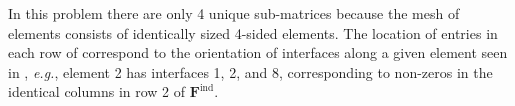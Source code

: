 \noindent
In this problem there are only 4 unique sub-matrices because the mesh of elements consists of identically sized 4-sided elements. 
The location of entries in each row of  correspond to the orientation of interfaces along a given element seen in , \emph{e.g.}, element 2 has interfaces 1, 2, and 8, corresponding to non-zeros in the identical columns in row 2 of $\textbf{F}^{\text{ind}}$.

